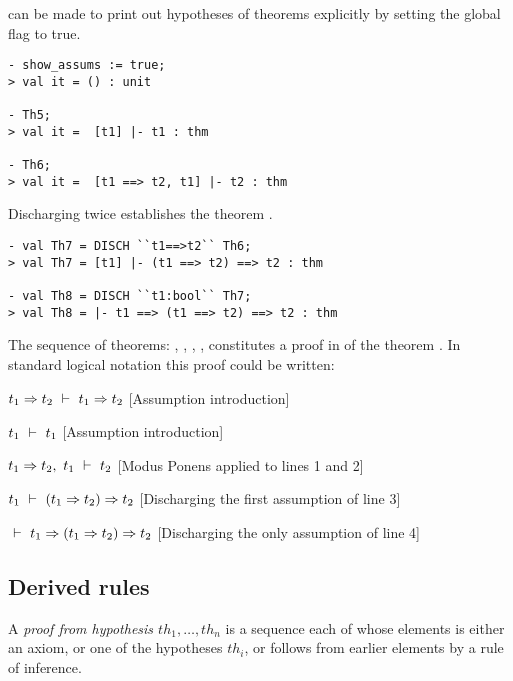     \HOL{} can be made to print out hypotheses of theorems explicitly
    by setting the global flag  to true.

\begin{session}\begin{verbatim}
- show_assums := true;
> val it = () : unit

- Th5;
> val it =  [t1] |- t1 : thm

- Th6;
> val it =  [t1 ==> t2, t1] |- t2 : thm
\end{verbatim}\end{session}


\noindent Discharging  twice establishes the theorem
.

\begin{session}\begin{verbatim}
- val Th7 = DISCH ``t1==>t2`` Th6;
> val Th7 = [t1] |- (t1 ==> t2) ==> t2 : thm

- val Th8 = DISCH ``t1:bool`` Th7;
> val Th8 = |- t1 ==> (t1 ==> t2) ==> t2 : thm
\end{verbatim}\end{session}

    The sequence of theorems: , , , ,
     constitutes a proof in \HOL{} of the theorem . In standard logical notation this proof
    could be written:

\begin{proofenumerate}
\item $ t_1\Rightarrow t_2\ \vdash\  t_1\Rightarrow t_2$ \hfill
[Assumption introduction]
\item $ t_1\ \vdash\  t_1$ \hfill
[Assumption introduction]
\item $ t_1\Rightarrow t_2,\ t_1 \ \vdash\  t_2 $ \hfill
[Modus Ponens applied to lines 1 and 2]
\item $ t_1 \ \vdash\  (t_1\Rightarrow t_2)\Rightarrow t_2$ \hfill
[Discharging the first assumption of line 3]
\item $ \ \vdash\  t_1 \Rightarrow (t_1 \Rightarrow t_2) \Rightarrow t_2$ \hfill
[Discharging the only assumption of line 4]
\end{proofenumerate}

\subsection{Derived rules}


A {\it proof from hypothesis $th_1, \ldots, th_n$} is a sequence each
of whose elements is either an axiom, or one of the hypotheses $th_i$,
or follows from earlier elements by a rule of inference.

